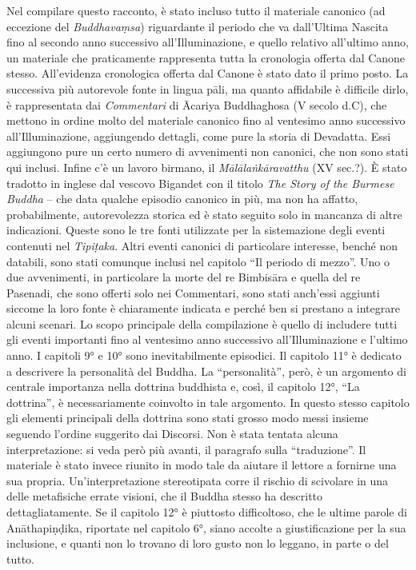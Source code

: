 Nel compilare questo racconto, è stato incluso tutto il materiale
canonico (ad eccezione del \emph{Buddhavaṃsa}) riguardante il periodo che va
dall’Ultima Nascita fino al secondo anno successivo all’Illuminazione, e
quello relativo all’ultimo anno, un materiale che praticamente
rappresenta tutta la cronologia offerta dal Canone stesso. All’evidenza
cronologica offerta dal Canone è stato dato il primo posto. La
successiva più autorevole fonte in lingua pāli, ma quanto affidabile è
difficile dirlo, è rappresentata dai \emph{Commentari} di Ācariya Buddhaghosa
(V secolo d.C), che mettono in ordine molto del materiale canonico fino
al ventesimo anno successivo all’Illuminazione, aggiungendo dettagli,
come pure la storia di Devadatta. Essi aggiungono pure un certo numero
di avvenimenti non canonici, che non sono stati qui inclusi. Infine c’è
un lavoro birmano, il \emph{Mālālaṅkāravatthu} (XV sec.?). È stato tradotto
in inglese dal vescovo Bigandet con il titolo \emph{The Story of the Burmese
Buddha} – che data qualche episodio canonico in più, ma non ha affatto,
probabilmente, autorevolezza storica ed è stato seguito solo in mancanza
di altre indicazioni. Queste sono le tre fonti utilizzate per la
sistemazione degli eventi contenuti nel \emph{Tipiṭaka}. Altri eventi
canonici di particolare interesse, benché non databili, sono stati
comunque inclusi nel capitolo “Il periodo di mezzo”. Uno o due
avvenimenti, in particolare la morte del re Bimbisāra e quella del re
Pasenadi, che sono offerti solo nei Commentari, sono stati anch’essi
aggiunti siccome la loro fonte è chiaramente indicata e perché ben si
prestano a integrare alcuni scenari. Lo scopo principale della
compilazione è quello di includere tutti gli eventi importanti fino al
ventesimo anno successivo all’Illuminazione e l’ultimo anno. I capitoli
9° e 10° sono inevitabilmente episodici. Il capitolo 11° è dedicato a
descrivere la personalità del Buddha. La “personalità”, però, è un
argomento di centrale importanza nella dottrina buddhista e, così, il
capitolo 12°, “La dottrina”, è necessariamente coinvolto in tale
argomento. In questo stesso capitolo gli elementi principali della
dottrina sono stati grosso modo messi insieme seguendo l’ordine
suggerito dai Discorsi. Non è stata tentata alcuna interpretazione: si
veda però più avanti, il paragrafo sulla “traduzione”. Il materiale è
stato invece riunito in modo tale da aiutare il lettore a fornirne una
sua propria. Un’interpretazione stereotipata corre il rischio di
scivolare in una delle metafisiche errate visioni, che il Buddha stesso
ha descritto dettagliatamente. Se il capitolo 12° è piuttosto
difficoltoso, che le ultime parole di Anāthapiṇḍika, riportate nel
capitolo 6°, siano accolte a giustificazione per la sua inclusione, e
quanti non lo trovano di loro gusto non lo leggano, in parte o del
tutto.

